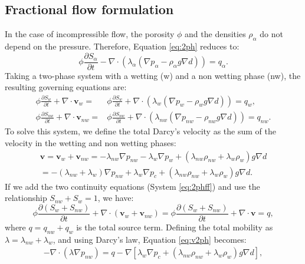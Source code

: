 \documentclass[12pt]{article}
\begin{document}
\subsection*{Fractional flow formulation}
\hspace{0.5cm}In the case of incompressible flow, the porosity $\phi$ and the densities $\rho_{\alpha}$ do not depend on the 
pressure. Therefore, Equation \eqref{eq:2ph} reduces to: 
\begin{equation}\label{eq:2ph1}
 \phi \frac{\partial S_{\alpha}}{\partial t}-\nabla \cdot (  \lambda_{\alpha}(\nabla p_{\alpha}-\rho_{\alpha}g \nabla d))= q_{\alpha}.
\end{equation}
Taking a two-phase system with a wetting (w) and a non wetting phase (nw), the resulting governing equations are:
\begin{align}\label{eq:2phff}
 \phi\frac{\partial{S}_{w}}{\partial t}+\nabla \cdot  \mathbf{v}_{w}=&\phi\frac{\partial{S}_{w}}{\partial t}+\nabla \cdot ( \lambda_{w}(\nabla p_w-\rho_wg \nabla d))= q_{w},\nonumber \\
 \phi\frac{\partial{S}_{nw}}{\partial t}+\nabla \cdot \mathbf{v}_{nw}=&\phi\frac{\partial{S}_{nw}}{\partial t}+\nabla \cdot ( \lambda_{nw}(\nabla p_{nw}-\rho_{nw}g \nabla d))= q_{nw}.
\end{align}
To solve this system, we define the total Darcy's velocity as the sum of the velocity in the wetting and non wetting phases:
\begin{align}\label{eq:totv}
\mathbf{v}=\mathbf{v}_w+\mathbf{v}_{nw}=-\lambda_{nw}\nabla p_{nw}-\lambda_{w}\nabla p_w+(\lambda_{nw} \rho_{nw}+\lambda_w\rho_w)g\nabla d \nonumber \\
=-(\lambda_{nw}+\lambda_w)\nabla p_{nw}+\lambda_w\nabla p_c+(\lambda_{nw} \rho_{nw}+\lambda_w\rho_w)g\nabla d.
\end{align}
If we add the two continuity equations (System \eqref{eq:2phff}) and use the relationship $S_{nw}+S_w=1$, we have:
\begin{equation}\label{eq:v2ph}
 \phi\frac{\partial( {S}_{w}+S_{nw})}{\partial t}+\nabla \cdot ( \mathbf{v}_{w}+\mathbf{v}_{nw})=  \phi\frac{\partial( {S}_{w}+S_{nw})}{\partial t}+\nabla \cdot \mathbf{v}=q, 
\end{equation}
where $q=q_{nw}+q_w$ is the total source term. Defining the total mobility as $\lambda=\lambda_{nw}+\lambda_w$, and using Darcy's law, Equation \eqref{eq:v2ph} becomes:
\begin{align}\label{eq:pnw}
-\nabla \cdot (\lambda \nabla p_{nw})=q-\nabla[\lambda_w\nabla p_c+(\lambda_{nw}\rho_{nw}+\lambda_w\rho_w)g\nabla d],
\end{align}
\end{document}
